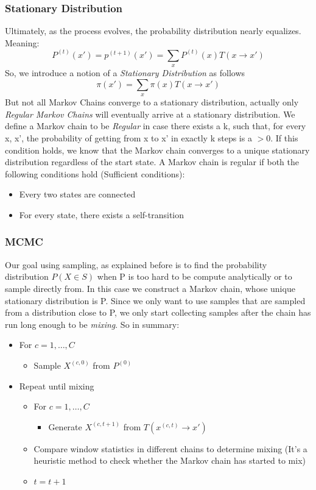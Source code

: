 \documentclass{article}
\begin{document}
\subsubsection{Stationary Distribution}
    Ultimately, as the process evolves, the probability distribution nearly equalizes. Meaning: $$ P^(t) (x') = p^(t+1)(x') = \sum_x P^{(t)}(x)T(x \rightarrow x')$$
    So, we introduce a notion of a \textit{Stationary Distribution} as follows $$ \pi(x') = \sum_x \pi(x)T(x \rightarrow x')$$
    But not all Markov Chains converge to a stationary distribution, actually only \textit{Regular Markov Chains} will eventually arrive at a stationary distribution. We define a Markov chain to be \textit{Regular} in case there exists a k, such that, for every x, x', the probability of getting from x to x' in exactly k steps is a $ > 0$. If this condition holds, we know that the Markov chain converges to a unique stationary distribution regardless of the start state. A Markov chain is regular if both the following conditions hold (Sufficient conditions):
    
    \begin{itemize}
        \item Every two states are connected
        \item For every state, there exists a self-transition
    \end{itemize}
            
\subsubsection{MCMC}
    Our goal using sampling, as explained before is to find the probability distribution $P(X \in S)$ when P is too hard to be compute analytically or to sample directly from. In this case we construct a Markov chain, whose unique stationary distribution is P. Since we only want to use samples that are sampled from a distribution close to P, we only start collecting samples after the chain has run long enough to be \textit{mixing}. So in summary:
    
    \begin{itemize}
        \item For $c=1, \ldots, C$
        \begin{itemize}
            \item Sample $X^{(c, 0)}$ from $P^{(0)}$
        \end{itemize}
        \item Repeat until mixing
        \begin{itemize}
            \item For $c=1, \ldots, C$
            \begin{itemize}
                \item Generate $X^{(c, t+1)}$ from $T(x^{(c, t)} \rightarrow x')$
            \end{itemize}
            \item Compare window statistics in different chains to determine mixing (It's a heuristic method to check whether the Markov chain has started to mix)
            \item $t=t+1$
        \end{itemize}
    \end{itemize}
    
\end{document}

